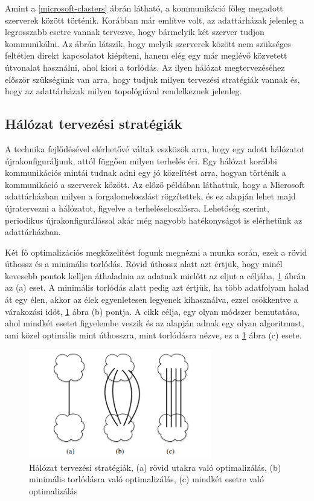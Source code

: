 \documentclass[12pt]{report}
\begin{document}
Amint a \ref{microsoft-clasters} ábrán látható, a kommunikáció főleg megadott szerverek között történik.
Korábban már említve volt, az adattárházak jelenleg a legrosszabb esetre vannak tervezve, hogy bármelyik két szerver tudjon kommunikálni.
Az ábrán látszik, hogy melyik szerverek között nem szükséges feltétlen direkt kapcsolatot kiépíteni, hanem elég egy már meglévő közvetett útvonalat használni, ahol kicsi a torlódás.
Az ilyen hálózat megtervezéséhez először szükségünk van arra, hogy tudjuk milyen tervezési stratégiák vannak és, hogy az adattárházak milyen topológiával rendelkeznek jelenleg.

\subsection{Hálózat tervezési stratégiák}

A technika fejlődésével elérhetővé váltak eszközök arra, hogy egy adott hálózatot újrakonfiguráljunk, attól függően milyen terhelés éri.
Egy hálózat korábbi kommunikációs mintái tudnak adni egy jó közelítést arra, hogyan történik a kommunikáció a szerverek között.
Az előző példában láthattuk, hogy a Microsoft adattárházban milyen a forgalomeloszlást rögzítettek, 
és ez alapján lehet majd újratervezni a hálózatot, figyelve a terheléseloszlásra.
Lehetőség szerint, periodikus újrakonfigurálással akár még nagyobb hatékonyságot is elérhetünk az adattárházban.

Két fő optimalizációs megközelítést fogunk megnézni a munka során, ezek a rövid úthossz és a minimális torlódás.
Rövid úthossz alatt azt értjük, hogy minél kevesebb pontok kelljen áthaladnia az adatnak mielőtt az eljut a céljába, \ref{network_strategies} ábrán az (a) eset.
A minimális torlódás alatt pedig azt értjük, ha több adatfolyam halad át egy élen, akkor az élek egyenletesen legyenek kihasználva, ezzel csökkentve a várakozási időt, \ref{network_strategies} ábra (b) pontja.
A cikk célja, egy olyan módszer bemutatása, ahol mindkét esetet figyelembe veszik és az alapján adnak egy olyan algoritmust, ami közel optimális mint úthosszra, mint torlódásra nézve, ez a \ref{network_strategies} ábra (c) esete.


\begin{figure}[h]
	\centering
	\includegraphics[width=8cm]{pictures/optimalshemes.png}
	\caption{Hálózat tervezési stratégiák, (a) rövid utakra való optimalizálás, (b) minimális torlódásra való optimalizálás, (c) mindkét esetre való optimalizálás}
	\label{network_strategies}
\end{figure}
\end{document}
